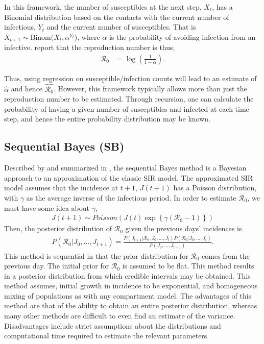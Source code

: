 \documentclass[12pt]{article}
\newcommand{\rr}{\ensuremath{\mathcal{R}_0}}
\begin{document}
In this framework, the number of susceptibles at the next step, $X_{t}$, has a Binomial distribution based on the contacts with the current number of infectious, $Y_{t}$ and the current number of susceptibles.  That is $X_{t+1} \sim \text{Binom}(X_t, \alpha^{Y_t}$), where $\alpha$ is the probability of avoiding infection from an infective.  \cite{barbour2004} report that the reproduction number is thus,
\begin{align}\label{eq:r0-mc}
\rr &= \log \left ( \frac{1}{1-\alpha}\right ).
\end{align}

Thus, using regression on susceptible/infection counts will lead to an estimate of $\hat{\alpha}$ and hence $\hat{\rr}$.  However, this framework typically allows more than just the reproduction number to be estimated.  Through recursion, one can calculate the probability of having a given number of susceptibles and infected at each time step, and hence the entire probability distribution may be known.





\subsection{Sequential Bayes (SB)}\label{sec:seqbayes}

Described by \cite{bettencourt2008} and summarized in \cite{obadia2012r0}, the sequential Bayes method is a Bayesian approach to an approximation of the classic SIR model.  The approximated SIR model assumes that the incidence at $t+1$, $J(t+1)$ has a Poisson distribution, with $\gamma$ as the  average inverse of the infectious period. In order to estimate $\rr$, we must have some idea about $\gamma$,
\begin{align*}
J(t+1)  \sim Poisson( J(t) \exp \left \{  \gamma (\rr-1)\right \})
\end{align*}
Then, the posterior distribution of $\rr$ given the previous days' incidences is
\begin{align*}
  P(\rr | J_0, \dots, J_{t+1}) = \frac{P(J_{t+1} | \rr, J_0, \dots, J_t)P(\rr| J_0, \dots, J_t)}{P(J_0, \dots, J_{t+1})}.
\end{align*}
This method is sequential in that the prior distribution for $\rr$ comes from the previous day.  The initial prior for $\rr$ is assumed to be flat.  This method results in a posterior distribution from which credible intervals may be obtained.  This method assumes, initial growth in incidence to be exponential, and homogeneous mixing of populations as with any compartment model.  The advantages of this method are that of the ability to obtain an entire posterior distribution, whereas many other methods are difficult to even find an estimate of the variance.  Disadvantages include strict assumptions about the distributions and computational time required to estimate the relevant parameters. 
\end{document}
